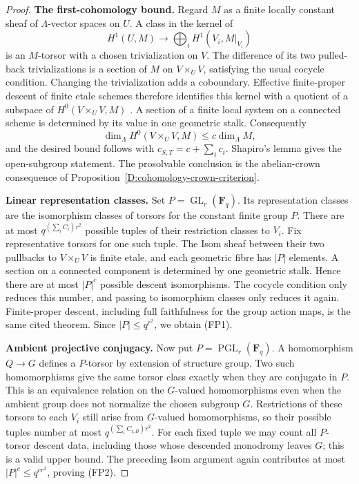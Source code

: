 \begin{proof}
\par\smallskip\noindent\textbf{The first-cohomology bound.}\quad
Regard \(M\) as a finite locally constant sheaf of
\(\Lambda\)-vector spaces on \(U\).  A class in the kernel of
\[
 H^1(U,M)\longrightarrow\bigoplus_i H^1(V_i,M|_{V_i})
\]
is an \(M\)-torsor with a chosen trivialization on \(V\).
The difference of its two pulled-back trivializations is a
section of \(M\) on \(V\times_U V\), satisfying the usual
cocycle condition.  Changing the trivialization adds a
coboundary.  Effective finite-proper descent of finite etale
schemes therefore identifies this kernel with a quotient of
a subspace of \(H^0(V\times_U V,M)\)
\citep[Expose~IX, Theorem~4.7]{C_SGA1}.
A section of a finite local system on a connected scheme is
determined by its value in one geometric stalk.  Consequently
\[
 \dim_\Lambda H^0(V\times_U V,M)\leq c\dim_\Lambda M,
\]
and the desired bound follows with
\(c_{S,T}=c+\sum_i c_i\).
Shapiro's lemma gives the open-subgroup statement.
The prosolvable conclusion is the abelian-crown consequence
of Proposition~\ref{D:cohomology-crown-criterion}.

\par\smallskip\noindent\textbf{Linear representation classes.}\quad
Set \(P=\operatorname{GL}_r(\mathbf F_q)\).
Its representation classes are the isomorphism classes of
torsors for the constant finite group \(P\).
There are at most \(q^{(\sum_i C_i)r^2}\) possible tuples of
their restriction classes to \(V_i\).
Fix representative torsors for one such tuple.
The Isom sheaf between their two pullbacks to \(V\times_U V\)
is finite etale, and each geometric fibre has \(|P|\) elements.
A section on a connected component is determined by one
geometric stalk.  Hence there are at most \(|P|^c\) possible
descent isomorphisms.  The cocycle condition only reduces this
number, and passing to isomorphism classes only reduces it
again.  Finite-proper descent, including full faithfulness for
the group action maps, is the same cited theorem.
Since \(|P|\leq q^{r^2}\), we obtain (FP1).

\par\smallskip\noindent\textbf{Ambient projective conjugacy.}\quad
Now put \(P=\operatorname{PGL}_r(\mathbf F_q)\).
A homomorphism \(Q\to G\) defines a \(P\)-torsor by extension
of structure group.  Two such homomorphisms give the same
torsor class exactly when they are conjugate in \(P\).
This is an equivalence relation on the \(G\)-valued
homomorphisms even when the ambient group does not normalize
the chosen subgroup \(G\).
Restrictions of these torsors to each \(V_i\) still arise
from \(G\)-valued homomorphisms, so their possible tuples
number at most \(q^{(\sum_i C_{i,B})r^2}\).
For each fixed tuple we may count all \(P\)-torsor descent
data, including those whose descended monodromy leaves \(G\);
this is a valid upper bound.  The preceding Isom argument
again contributes at most \(|P|^c\leq q^{cr^2}\), proving (FP2).


\end{proof}
